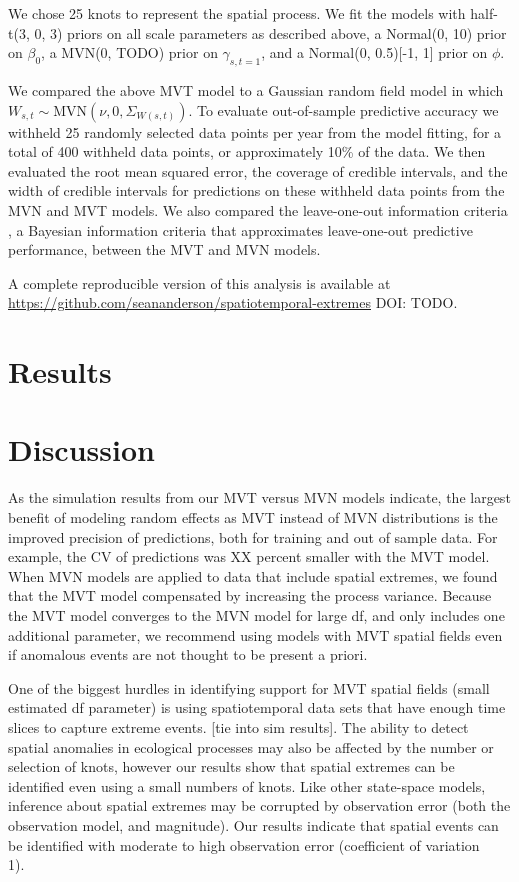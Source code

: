 \documentclass[12pt,english]{article}
\begin{document}
\begin{spacing}{1.5}
We chose 25 knots to represent the spatial process.
We fit the models with half-t(3, 0, 3) priors on all
scale parameters as described above,
a Normal(0, 10) prior on $\beta_0$,
a MVN(0, TODO) prior on $\gamma_{s,t=1}$,
and a Normal(0, 0.5)[-1, 1] prior on $\phi$.

We compared the above MVT
model to a Gaussian random field model in which
$W_{s,t} \sim \mathrm{MVN}\left(\nu, 0, \Sigma_{W(s,t)}\right)$.
To evaluate out-of-sample predictive accuracy we withheld
25 randomly selected data points
per year from the model fitting,
for a total of 400 withheld data points,
or approximately 10\% of the data.
We then evaluated the root mean squared error,
the coverage of credible intervals, and the width of credible intervals
for predictions on these withheld data points
from the MVN and MVT models.
We also compared the leave-one-out information criteria
\citep[LOOIC;][]{vehtari2016}, a Bayesian information criteria that approximates
leave-one-out predictive performance,
between the MVT and MVN models.

A complete reproducible version of this analysis is available at
\url{https://github.com/seananderson/spatiotemporal-extremes} DOI: TODO.

\section{Results}

\section{Discussion}

As the simulation results from our MVT versus MVN models indicate, the largest
benefit of modeling random effects as MVT instead of MVN distributions is the
improved precision of predictions, both for training and out of sample data.
For example, the CV of predictions was XX percent smaller with the MVT model.
When MVN models are applied to data that include spatial extremes, we found that
the MVT model compensated by increasing the process variance. Because the MVT model
converges to the MVN model for large df, and only includes one additional parameter,
we recommend using models with MVT spatial fields even if anomalous events are not
thought to be present a priori.

One of the biggest hurdles in identifying support for MVT spatial fields (small estimated
df parameter) is using spatiotemporal data sets that have enough time slices to capture
extreme events. [tie into sim results]. The ability to detect spatial anomalies in ecological
processes may also be affected by the number or selection of knots, however our results
show that spatial extremes can be identified even using a small numbers of knots. Like other
state-space models, inference about spatial extremes may be corrupted by observation
error (both the observation model, and magnitude). Our results indicate that spatial events
can be identified with moderate to high observation error (coefficient of variation ~ 1).


\end{spacing}
\end{document}
